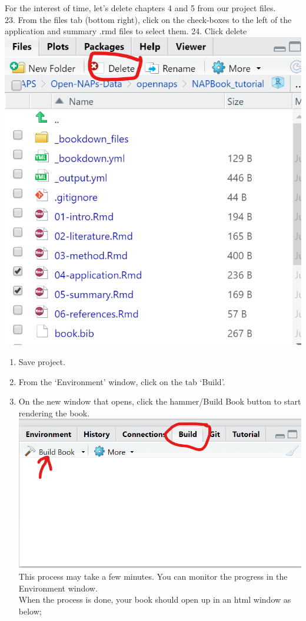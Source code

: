 \documentclass[
]{book}
\providecommand{\tightlist}{%
  \setlength{\itemsep}{0pt}\setlength{\parskip}{0pt}}
\begin{document}
For the interest of time, let's delete chapters 4 and 5 from our project files.\\
23. From the files tab (bottom right), click on the check-boxes to the left of the application and summary .rmd files to select them.
24. Click delete\\
\includegraphics{tutorial_screenshots/delete_4_5.png}

\begin{enumerate}
\def\labelenumi{\arabic{enumi}.}
\setcounter{enumi}{24}
\tightlist
\item
  Save project.\\
\item
  From the `Environment' window, click on the tab `Build'.\\
\item
  On the new window that opens, click the hammer/Build Book button to start rendering the book. \includegraphics{tutorial_screenshots/build_book.png}\\
  This process may take a few minutes. You can monitor the progress in the Environment window.\\
  When the process is done, your book should open up in an html window as below;
\end{enumerate}
\end{document}
